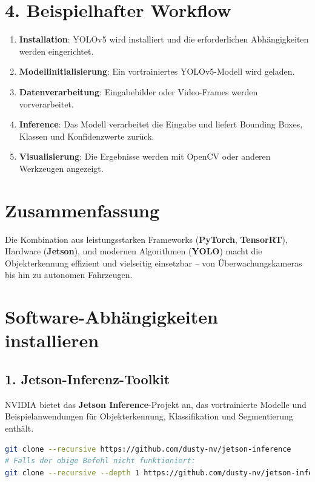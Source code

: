\documentclass{article}
\begin{document}
\section*{4. Beispielhafter Workflow}
\begin{enumerate}
    \item \textbf{Installation}: YOLOv5 wird installiert und die erforderlichen Abhängigkeiten werden eingerichtet.
    \item \textbf{Modellinitialisierung}: Ein vortrainiertes YOLOv5-Modell wird geladen.
    \item \textbf{Datenverarbeitung}: Eingabebilder oder Video-Frames werden vorverarbeitet.
    \item \textbf{Inference}: Das Modell verarbeitet die Eingabe und liefert Bounding Boxes, Klassen und Konfidenzwerte zurück.
    \item \textbf{Visualisierung}: Die Ergebnisse werden mit OpenCV oder anderen Werkzeugen angezeigt.
\end{enumerate}

\section*{Zusammenfassung}
Die Kombination aus leistungsstarken Frameworks (\textbf{PyTorch}, \textbf{TensorRT}), Hardware (\textbf{Jetson}), und modernen Algorithmen (\textbf{YOLO}) macht die Objekterkennung effizient und vielseitig einsetzbar – von Überwachungskameras bis hin zu autonomen Fahrzeugen.


\clearpage
\section*{Software-Abhängigkeiten installieren}

\subsection*{1. Jetson-Inferenz-Toolkit}
NVIDIA bietet das \textbf{Jetson Inference}-Projekt an, das vortrainierte Modelle und Beispielanwendungen für Objekterkennung, Klassifikation und Segmentierung enthält.

\begin{lstlisting}[language=bash]
git clone --recursive https://github.com/dusty-nv/jetson-inference
# Falls der obige Befehl nicht funktioniert:
git clone --recursive --depth 1 https://github.com/dusty-nv/jetson-inference
\end{lstlisting}
\end{document}
